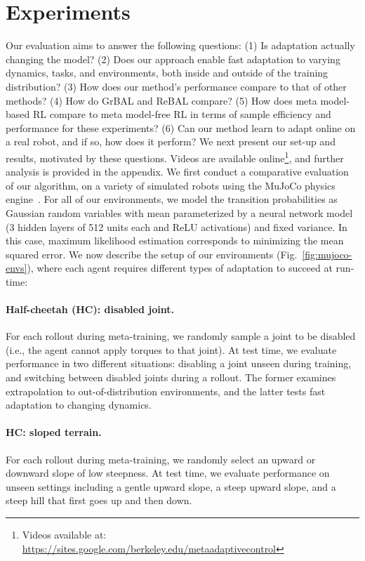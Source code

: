 \vspsec
\section{Experiments}\label{sec:results}
\vspsec
Our evaluation aims to answer the following questions: (1) Is adaptation actually changing the model? (2) Does our approach enable fast adaptation to varying dynamics, tasks, and environments, both inside and outside of the training distribution? (3) How does our method's performance compare to that of other methods? (4) How do GrBAL and ReBAL compare? (5) How does meta model-based RL compare to meta model-free RL in terms of sample efficiency and performance for these experiments? (6) Can our method learn to adapt online on a real robot, and if so, how does it perform?
We next present our set-up and results, motivated by these questions. Videos are available online\footnote{Videos available at: \url{https://sites.google.com/berkeley.edu/metaadaptivecontrol}}, and further analysis is provided in the appendix.
We first conduct a comparative evaluation of our algorithm, on a variety of simulated robots using the MuJoCo physics engine~\citep{todorov2012mujoco}. For all of our environments, we model the transition probabilities as Gaussian random variables with mean parameterized by a neural network model (3 hidden layers of 512 units each and ReLU activations) and fixed variance. In this case, maximum likelihood estimation corresponds to minimizing the mean squared error. We now describe the setup of our environments (Fig.~\ref{fig:mujoco-envs}), where each agent requires different types of adaptation to succeed at run-time:

\vspace{-0.1in}
\paragraph{Half-cheetah (HC): disabled joint.} For each rollout during meta-training, we randomly sample a joint to be disabled (i.e., the agent cannot apply torques to that joint). At test time, we evaluate performance in two different situations: disabling a joint unseen during training, and switching between disabled joints during a rollout. The former examines extrapolation to out-of-distribution environments, and the latter tests fast adaptation to changing dynamics.

\paragraph{HC: sloped terrain.} For each rollout during meta-training, we randomly select an upward or downward slope of low steepness. At test time, we evaluate performance on unseen settings including a gentle upward slope, a steep upward slope, and a steep hill that first goes up and then down.

